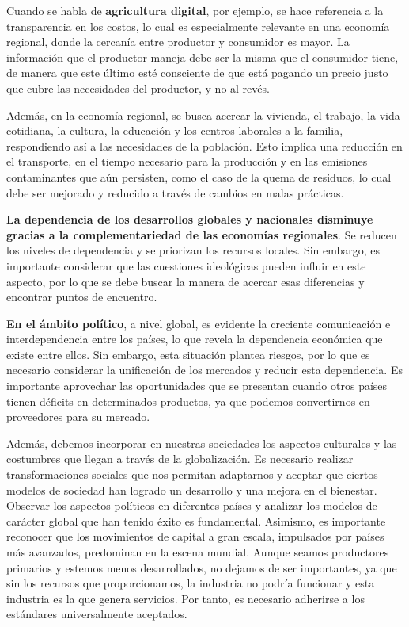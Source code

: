 \documentclass[
  jou,
  floatsintext,
  longtable,
  a4paper,
  nolmodern,
  notxfonts,
  notimes,
  12pt,
  colorlinks=true,linkcolor=blue,citecolor=blue,urlcolor=blue]{apa7}
\begin{document}
Cuando se habla de \textbf{agricultura digital}, por ejemplo, se hace
referencia a la transparencia en los costos, lo cual es especialmente
relevante en una economía regional, donde la cercanía entre productor y
consumidor es mayor. La información que el productor maneja debe ser la
misma que el consumidor tiene, de manera que este último esté consciente
de que está pagando un precio justo que cubre las necesidades del
productor, y no al revés.

Además, en la economía regional, se busca acercar la vivienda, el
trabajo, la vida cotidiana, la cultura, la educación y los centros
laborales a la familia, respondiendo así a las necesidades de la
población. Esto implica una reducción en el transporte, en el tiempo
necesario para la producción y en las emisiones contaminantes que aún
persisten, como el caso de la quema de residuos, lo cual debe ser
mejorado y reducido a través de cambios en malas prácticas.

\textbf{La dependencia de los desarrollos globales y nacionales
disminuye gracias a la complementariedad de las economías regionales}.
Se reducen los niveles de dependencia y se priorizan los recursos
locales. Sin embargo, es importante considerar que las cuestiones
ideológicas pueden influir en este aspecto, por lo que se debe buscar la
manera de acercar esas diferencias y encontrar puntos de encuentro.

\textbf{En el ámbito político}, a nivel global, es evidente la creciente
comunicación e interdependencia entre los países, lo que revela la
dependencia económica que existe entre ellos. Sin embargo, esta
situación plantea riesgos, por lo que es necesario considerar la
unificación de los mercados y reducir esta dependencia. Es importante
aprovechar las oportunidades que se presentan cuando otros países tienen
déficits en determinados productos, ya que podemos convertirnos en
proveedores para su mercado.

Además, debemos incorporar en nuestras sociedades los aspectos
culturales y las costumbres que llegan a través de la globalización. Es
necesario realizar transformaciones sociales que nos permitan adaptarnos
y aceptar que ciertos modelos de sociedad han logrado un desarrollo y
una mejora en el bienestar. Observar los aspectos políticos en
diferentes países y analizar los modelos de carácter global que han
tenido éxito es fundamental. Asimismo, es importante reconocer que los
movimientos de capital a gran escala, impulsados por países más
avanzados, predominan en la escena mundial. Aunque seamos productores
primarios y estemos menos desarrollados, no dejamos de ser importantes,
ya que sin los recursos que proporcionamos, la industria no podría
funcionar y esta industria es la que genera servicios. Por tanto, es
necesario adherirse a los estándares universalmente aceptados.
\end{document}
